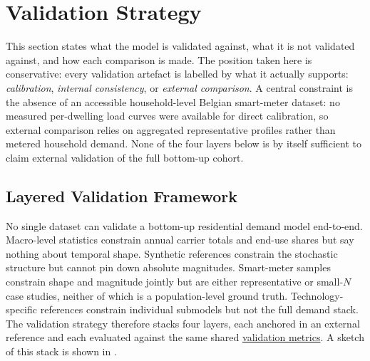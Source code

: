 \pagebreak
\section{Validation Strategy}
\label{sec:validation}

This section states what the model is validated against, what it is not validated against, and how each comparison is made. The position taken here is conservative: every validation artefact is labelled by what it actually supports: \emph{calibration}, \emph{internal consistency}, or \emph{external comparison}. A central constraint is the absence of an accessible household-level Belgian smart-meter dataset: no measured per-dwelling load curves were available for direct calibration, so external comparison relies on aggregated representative profiles rather than metered household demand. None of the four layers below is by itself sufficient to claim external validation of the full bottom-up cohort.

\subsection{Layered Validation Framework}
\label{sec:layeredValidation}

No single dataset can validate a bottom-up residential demand model end-to-end. Macro-level statistics constrain annual carrier totals and end-use shares but say nothing about temporal shape. Synthetic references constrain the stochastic structure but cannot pin down absolute magnitudes. Smart-meter samples constrain shape and magnitude jointly but are either representative or small-$N$ case studies, neither of which is a population-level ground truth. Technology-specific references constrain individual submodels but not the full demand stack. The validation strategy therefore stacks four layers, each anchored in an external reference and each evaluated against the same shared \hyperref[sec:validationMetrics]{validation metrics}. A sketch of this stack is shown in .



